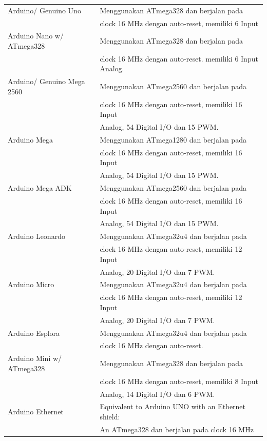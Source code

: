 \begin{table}[!ht]
\centering
\begin{tabular}{ |l|l| }
\hline
Arduino/ Genuino Uno & Menggunakan ATmega328 dan berjalan pada \\
& clock 16 MHz dengan auto-reset, memiliki 6 Input \\
\hline
Arduino Nano w/ ATmega328 & Menggunakan ATmega328 dan berjalan pada \\
& clock 16 MHz dengan auto-reset. memiliki 6 Input Analog.\\
\hline
Arduino/ Genuino Mega 2560 & Menggunakan ATmega2560 dan berjalan pada \\
& clock 16 MHz dengan auto-reset, memiliki 16 Input \\
& Analog, 54 Digital I/O dan 15 PWM. \\
\hline
Arduino Mega & Menggunakan ATmega1280 dan berjalan pada \\
& clock 16 MHz dengan auto-reset, memiliki 16 Input \\
& Analog, 54 Digital I/O dan 15 PWM.\\
\hline
Arduino Mega ADK & Menggunakan ATmega2560 dan berjalan pada \\
& clock 16 MHz dengan auto-reset, memiliki 16 Input \\
& Analog, 54 Digital I/O dan 15 PWM. \\
\hline
Arduino Leonardo & Menggunakan ATmega32u4 dan berjalan pada \\
& clock 16 MHz dengan auto-reset, memiliki 12 Input \\
& Analog, 20 Digital I/O dan 7 PWM.\\
\hline
Arduino Micro & Menggunakan ATmega32u4 dan berjalan pada \\
& clock 16 MHz dengan auto-reset, memiliki 12 Input \\
& Analog, 20 Digital I/O dan 7 PWM. \\
\hline
Arduino Esplora & Menggunakan ATmega32u4 dan berjalan pada \\
& clock 16 MHz dengan auto-reset.\\
\hline
Arduino Mini w/ ATmega328 & Menggunakan ATmega328 dan berjalan pada \\
& clock 16 MHz dengan auto-reset, memiliki 8 Input \\
& Analog, 14 Digital I/O dan 6 PWM.\\
\hline
Arduino Ethernet & Equivalent to Arduino UNO with an Ethernet shield: \\
& An ATmega328 dan berjalan pada clock 16 MHz \\ 

\end{tabular}
\end{table}

